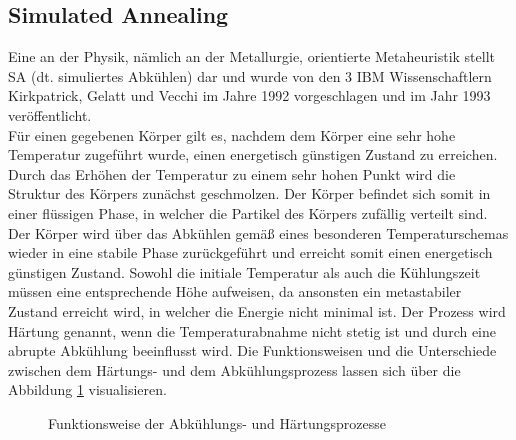 \subsection{Simulated Annealing} \label{subsec:Grundlagen_SimulatedAnnealing}

Eine an der Physik, nämlich an der Metallurgie, orientierte Metaheuristik stellt \acf{SA} (dt. simuliertes Abkühlen) dar und wurde von den 3 IBM Wissenschaftlern Kirkpatrick, Gelatt und Vecchi im Jahre 1992 vorgeschlagen und im Jahr 1993 veröffentlicht. \cite[vgl.][S. 19]{siarry_metaheuristics_2016} \\

Für einen gegebenen Körper gilt es, nachdem dem Körper eine sehr hohe Temperatur zugeführt wurde, einen energetisch günstigen Zustand zu erreichen. Durch das Erhöhen der Temperatur zu einem sehr hohen Punkt wird die Struktur des Körpers zunächst geschmolzen. Der Körper befindet sich somit in einer flüssigen Phase, in welcher die Partikel des Körpers zufällig verteilt sind. Der Körper wird über das Abkühlen gemäß eines besonderen Temperaturschemas wieder in eine stabile Phase zurückgeführt und erreicht somit einen energetisch günstigen Zustand. Sowohl die initiale Temperatur als auch die Kühlungszeit müssen eine entsprechende Höhe aufweisen, da ansonsten ein metastabiler Zustand erreicht wird, in welcher die Energie nicht minimal ist. Der Prozess wird Härtung genannt, wenn die Temperaturabnahme nicht stetig ist und durch eine abrupte Abkühlung beeinflusst wird. Die Funktionsweisen und die Unterschiede zwischen dem Härtungs- und dem Abkühlungsprozess lassen sich über die Abbildung \ref{img:simulatedannealing_realworld} visualisieren. \cite[vgl.][S. 2 f.]{gendreau_handbook_2019} 

\begin{figure}[H]
    \centering
    \noindent{}
    \caption{Funktionsweise der Abkühlungs- und Härtungsprozesse} 
    \label{img:simulatedannealing_realworld}
\end{figure}


